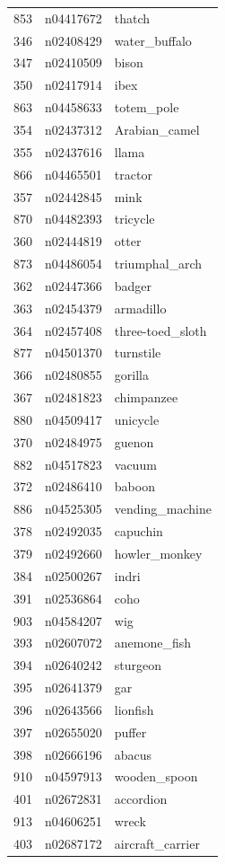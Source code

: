 \begin{table}
\begin{tabular}{cll}
853 & n04417672 & thatch \\
346 & n02408429 & water_buffalo \\
347 & n02410509 & bison \\
350 & n02417914 & ibex \\
863 & n04458633 & totem_pole \\
354 & n02437312 & Arabian_camel \\
355 & n02437616 & llama \\
866 & n04465501 & tractor \\
357 & n02442845 & mink \\
870 & n04482393 & tricycle \\
360 & n02444819 & otter \\
873 & n04486054 & triumphal_arch \\
362 & n02447366 & badger \\
363 & n02454379 & armadillo \\
364 & n02457408 & three-toed_sloth \\
877 & n04501370 & turnstile \\
366 & n02480855 & gorilla \\
367 & n02481823 & chimpanzee \\
880 & n04509417 & unicycle \\
370 & n02484975 & guenon \\
882 & n04517823 & vacuum \\
372 & n02486410 & baboon \\
886 & n04525305 & vending_machine \\
378 & n02492035 & capuchin \\
379 & n02492660 & howler_monkey \\
384 & n02500267 & indri \\
391 & n02536864 & coho \\
903 & n04584207 & wig \\
393 & n02607072 & anemone_fish \\
394 & n02640242 & sturgeon \\
395 & n02641379 & gar \\
396 & n02643566 & lionfish \\
397 & n02655020 & puffer \\
398 & n02666196 & abacus \\
910 & n04597913 & wooden_spoon \\
401 & n02672831 & accordion \\
913 & n04606251 & wreck \\
403 & n02687172 & aircraft_carrier \\

\end{tabular}
\end{table}
